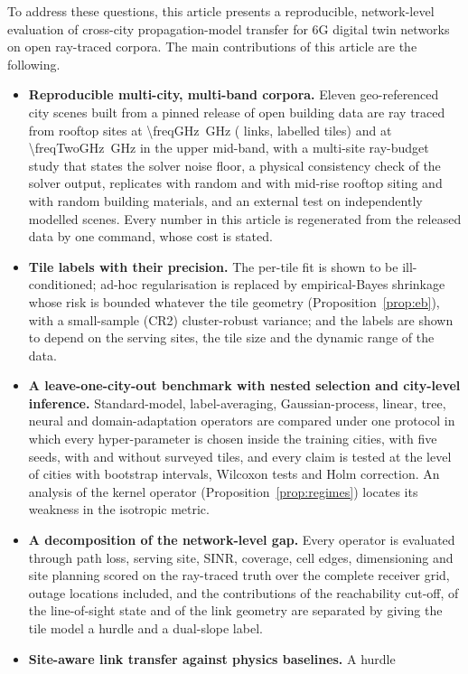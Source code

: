 To address these questions, this article presents a reproducible,
network-level evaluation of cross-city propagation-model transfer for 6G
digital twin networks on open ray-traced corpora. The main contributions of
this article are the following.
\begin{itemize}
\item \textbf{Reproducible multi-city, multi-band corpora.} Eleven
geo-referenced city scenes built from a pinned release of open building data
are ray traced from \nSites{} rooftop sites at \SI{\freqGHz}{\giga\hertz}
(\nSamples{} links, \nTiles{} labelled tiles) and at
\SI{\freqTwoGHz}{\giga\hertz} in the upper mid-band, with a multi-site
ray-budget study that states the solver noise floor, a physical consistency
check of the solver output, replicates with random and with mid-rise rooftop
siting and with random building materials, and an external test on
independently modelled scenes. Every number in this article is regenerated
from the released data by one command, whose cost is stated.
\item \textbf{Tile labels with their precision.} The per-tile fit is shown
to be ill-conditioned; ad-hoc regularisation is replaced by empirical-Bayes
shrinkage whose risk is bounded whatever the tile geometry
(Proposition~\ref{prop:eb}), with a small-sample (CR2) cluster-robust
variance; and the labels are shown to depend on the serving sites, the tile
size and the dynamic range of the data.
\item \textbf{A leave-one-city-out benchmark with nested selection and
city-level inference.} Standard-model, label-averaging, Gaussian-process,
linear, tree, neural and domain-adaptation operators are compared under one
protocol in which every hyper-parameter is chosen inside the training cities,
with five seeds, with and without surveyed tiles, and every claim is tested
at the level of cities with bootstrap intervals, Wilcoxon tests and Holm
correction. An analysis of the kernel operator
(Proposition~\ref{prop:regimes}) locates its weakness in the isotropic
metric.
\item \textbf{A decomposition of the network-level gap.} Every operator is
evaluated through path loss, serving site, SINR, coverage, cell edges,
dimensioning and site planning scored on the ray-traced truth over the
complete receiver grid, outage locations included, and the contributions of
the reachability cut-off, of the line-of-sight state and of the link
geometry are separated by giving the tile model a hurdle and a dual-slope
label.
\item \textbf{Site-aware link transfer against physics baselines.} A hurdle

\end{itemize}
